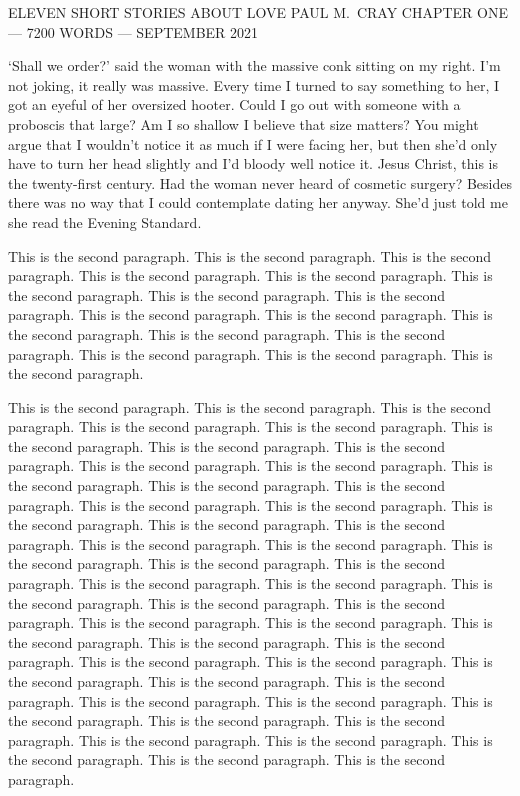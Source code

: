 {\parindent=0pt {\obeylines
{\twelvess ELEVEN SHORT STORIES ABOUT LOVE}
{\twelvess PAUL M.~CRAY}
{\twelvess CHAPTER ONE --- 7200 WORDS --- SEPTEMBER 2021}}

\twelverm
`Shall we order?' said the woman with the massive conk sitting on my
right. I'm not joking, it really {\twelveit was\/} massive. Every
time I turned to say something to her, I got an eyeful of her
oversized hooter. Could I go out with someone with a proboscis that
large? Am I so shallow I believe that size matters? You might argue
that I wouldn't notice it as much if I were facing her, but then
she'd only have to turn her head slightly and I'd bloody well notice
it. Jesus Christ, this is the twenty-first century. Had the woman
never heard of cosmetic surgery? Besides there was no way that I
could contemplate dating her anyway. She'd just told me she read the
{\twelvesl Evening Standard}.}

This is the second paragraph. This is the second paragraph. This is the second paragraph. This is the second paragraph. 
This is the second paragraph. This is the second paragraph. This is the second paragraph. This is the second paragraph. 
This is the second paragraph. This is the second paragraph. This is the second paragraph. This is the second paragraph. 
This is the second paragraph. This is the second paragraph. This is the second paragraph. This is the second paragraph. 

This is the second paragraph. This is the second paragraph. This is the second paragraph. This is the second paragraph.
This is the second paragraph. This is the second paragraph. This is the second paragraph. This is the second paragraph.
This is the second paragraph. This is the second paragraph. This is the second paragraph. This is the second paragraph.
This is the second paragraph. This is the second paragraph. This is the second paragraph. This is the second paragraph. 
This is the second paragraph. This is the second paragraph. This is the second paragraph. This is the second paragraph.
This is the second paragraph. This is the second paragraph. This is the second paragraph. This is the second paragraph.
This is the second paragraph. This is the second paragraph. This is the second paragraph. This is the second paragraph.
This is the second paragraph. This is the second paragraph. This is the second paragraph. This is the second paragraph. 
This is the second paragraph. This is the second paragraph. This is the second paragraph. This is the second paragraph.
This is the second paragraph. This is the second paragraph. This is the second paragraph. This is the second paragraph.
This is the second paragraph. This is the second paragraph. This is the second paragraph. This is the second paragraph.
This is the second paragraph. This is the second paragraph. This is the second paragraph. This is the second paragraph. 

